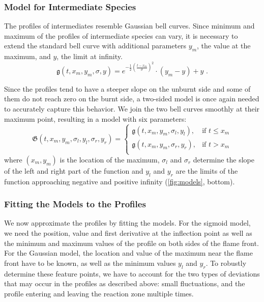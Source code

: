\subsubsection{Model for Intermediate Species} %
\label{ssub:model_for_intermediate_species}
%
The profiles of intermediates resemble Gaussian bell curves.
%
Since minimum and maximum of the profiles of intermediate species can vary, it
is necessary to extend the standard bell curve with additional parameters $y_m$,
the value at the maximum, and $y$, the limit at infinity.
%
\begin{equation}
	\mathfrak{g}(t, x_m, y_m, \sigma, y)
		= e^{-\frac{1}{2}(\frac{t-x_m}{\sigma})^2}\cdot(y_m-y)+y \text{ .}
\end{equation}
%

%
Since the profiles tend to have a steeper slope on the unburnt side and some of
them do not reach zero on the burnt side, a two-sided model is once again needed
to accurately capture this behavior.
%
We join the two bell curves smoothly at their maximum point, resulting in a
model with six parameters:
%
\begin{equation}
	\mathfrak{G}(t, x_m, y_m, \sigma_l, y_l, \sigma_r, y_r) =
	\begin{cases}
		\mathfrak{g}(t, x_m, y_m, \sigma_l, y_l), & \text{if }  t \leq x_m\\
		\mathfrak{g}(t, x_m, y_m, \sigma_r, y_r), & \text{if }  t > x_m\\
	\end{cases}
\end{equation}
%
where $(x_m, y_m)$ is the location of the maximum, $\sigma_l$ and $\sigma_r$
determine the slope of the left and right part of the function and $y_l$ and
$y_r$ are the limits of the function approaching negative and positive infinity
(\cref{fig:models}, bottom).
%
% 	
%
%
\subsubsection{Fitting the Models to the Profiles} %
\label{ssub:fitting_the_models}
%
We now approximate the profiles by fitting the models.
%
For the sigmoid model, we need the position, value and first derivative at the
inflection point as well as the minimum and maximum values of the profile on
both sides of the flame front.
%
For the Gaussian model, the location and value of the maximum near the flame
front have to be known, as well as the minimum values $y_l$ and $y_r$.
%
To robustly determine these feature points, we have to account for the two types
of deviations that may occur in the profiles as described above:
%
small fluctuations, and the profile entering and leaving the reaction zone
multiple times.
%

